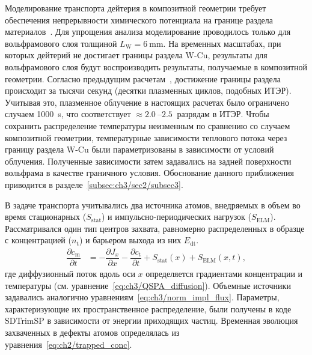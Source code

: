 Моделирование транспорта дейтерия в композитной геометрии требует обеспечения непрерывности химического потенциала на границе раздела материалов~\cite{Delaporte-Mathurin2021_3}. Для упрощения анализа моделирование проводилось только для вольфрамового слоя толщиной \( L_\mathrm{W}=\SI{6}{\milli\meter} \). На временных масштабах, при которых дейтерий не достигает границы раздела W-Cu, результаты для вольфрамового слоя будут воспроизводить результаты, получаемые в композитной геометрии. Согласно предыдущим расчетам~\cite{Delaporte-Mathurin2019, Delaporte-Mathurin2021_3}, достижение границы раздела происходит за тысячи секунд (десятки плазменных циклов, подобных ИТЭР). Учитывая это, плазменное облучение в настоящих расчетах было ограничено случаем \SI{1000}{\second}, что соответствует \( \approx \SIrange{2.0}{2.5}{} \) разрядам в ИТЭР. Чтобы сохранить распределение температуры неизменным по сравнению со случаем композитной геометрии, температурные зависимости теплового потока через границу раздела W-Cu были параметризованы в зависимости от условий облучения. Полученные зависимости затем задавались на задней поверхности вольфрама в качестве граничного условия. Обоснование данного приближения приводится в разделе~\cref{subsec:ch3/sec2/subsec3}.

В задаче транспорта учитывались два источника атомов, внедряемых в объем во время стационарных (\( S_\mathrm{stat} \)) и импульсно-периодических нагрузок (\( S_\mathrm{ELM} \)). Рассматривался один тип центров захвата, равномерно распределенных в образце с концентрацией (\( n_\mathrm{t} \)) и барьером выхода из них \(E_\mathrm{dt} \).
\begin{subequations}
	\label{eq:ch3/diffusion_equation_ITER}
	\begin{align}
		\dfrac{\partial c_{\mathrm{m}}}{\partial t} & =-\dfrac{\partial J_x}{\partial x} - \dfrac{\partial c_{\mathrm{t}}}{\partial t} + S_{\mathrm{stat}}(x)+S_{\mathrm{ELM}}(x,t),
	\end{align}
\end{subequations}
где диффузионный поток вдоль оси \( x \) определяется градиентами концентрации и температуры (см. уравнение~\cref{eq:ch3/QSPA_diffusion}). Объемные источники задавались аналогично уравнениям~\cref{eq:ch3/norm_impl_flux}. Параметры, характеризующие их пространственное распределение, были получены в коде SDTrimSP в зависимости от энергии приходящих частиц. Временная эволюция захваченных в дефекты атомов определялась из уравнения~\cref{eq:ch2/trapped_conc}.

